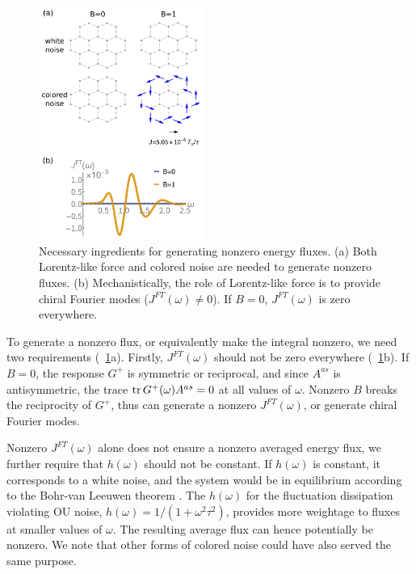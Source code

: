 \documentclass[
 preprint,
 preprintnumbers,
 amsmath,amssymb,
 aps,
 pre,
 longbibliography,
 superscriptaddress,
 10pt, twocolumn
]{revtex4-1}
\begin{document}
\begin{figure}[ht]
	\centering
	\includegraphics[width=0.48\textwidth]{ingredients.pdf}
    \caption{
    Necessary ingredients for generating nonzero energy fluxes.
    (a) Both Lorentz-like force and colored noise are needed to generate nonzero fluxes.
    (b) Mechanistically, the role of Lorentz-like force is to provide chiral Fourier modes ($J^{FT}(\omega)\neq 0$). If $B=0$, $J^{FT}(\omega)$ is zero everywhere.
    }
    \label{fig:ingredients}
\end{figure}

To generate a nonzero flux, or equivalently make the integral nonzero, we need two requirements (\figurename~\ref{fig:ingredients}a).
Firstly, $J^{FT}(\omega)$ should not be zero everywhere (\figurename~\ref{fig:ingredients}b).
If $B=0$, the response $G^+$ is symmetric or reciprocal, and since $A^{as}$ is antisymmetric, the trace $\tr G^+(\omega) A^{as}=0$ at all values of $\omega$. Nonzero $B$ breaks the reciprocity of $G^+$, thus can generate a nonzero $J^{FT}(\omega)$, or generate chiral Fourier modes.

Nonzero $J^{FT}(\omega)$ alone does not ensure a nonzero averaged energy flux, we further require that $h(\omega)$ should not be constant.
If $h(\omega)$ is constant, it corresponds to a white noise, and the system would be in equilibrium according to the Bohr-van Leeuwen theorem \cite{Pradhan2010NonexistenceClassical}.
The $h(\omega)$ for the fluctuation dissipation violating OU noise, $h(\omega)=1/(1+\omega^2\tau^2)$, provides more weightage to fluxes at smaller values of $\omega$. The resulting average flux can hence potentially be nonzero. We note that other forms of colored noise could have also served the same purpose.
\end{document}
